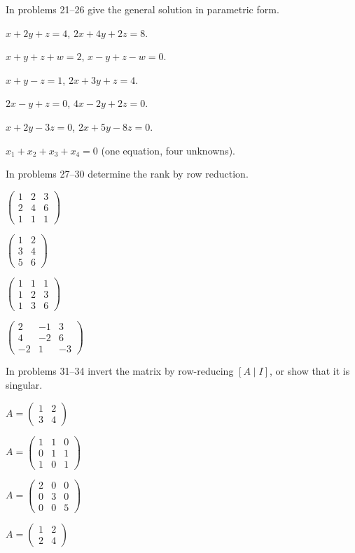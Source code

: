 In problems 21--26 give the general solution in parametric form.

\begin{problems}[resume]
  \item $x+2y+z=4$, \;$2x+4y+2z=8$.
  \item $x+y+z+w=2$, \;$x-y+z-w=0$.
  \item $x+y-z=1$, \;$2x+3y+z=4$.
  \item $2x-y+z=0$, \;$4x-2y+2z=0$.
  \item $x+2y-3z=0$, \;$2x+5y-8z=0$.
  \item $x_{1}+x_{2}+x_{3}+x_{4}=0$ \;(one equation, four unknowns).
\end{problems}

In problems 27--30 determine the rank by row reduction.

\begin{problems}[resume]
  \item $\begin{pmatrix}1&2&3\\2&4&6\\1&1&1\end{pmatrix}$
  \item $\begin{pmatrix}1&2\\3&4\\5&6\end{pmatrix}$
  \item $\begin{pmatrix}1&1&1\\1&2&3\\1&3&6\end{pmatrix}$
  \item $\begin{pmatrix}2&-1&3\\4&-2&6\\-2&1&-3\end{pmatrix}$
\end{problems}

In problems 31--34 invert the matrix by row-reducing $[A\mid I]$, or show
that it is singular.

\begin{problems}[resume]
  \item $A=\begin{pmatrix}1&2\\3&4\end{pmatrix}$
  \item $A=\begin{pmatrix}1&1&0\\0&1&1\\1&0&1\end{pmatrix}$
  \item $A=\begin{pmatrix}2&0&0\\0&3&0\\0&0&5\end{pmatrix}$
  \item $A=\begin{pmatrix}1&2\\2&4\end{pmatrix}$
\end{problems}

